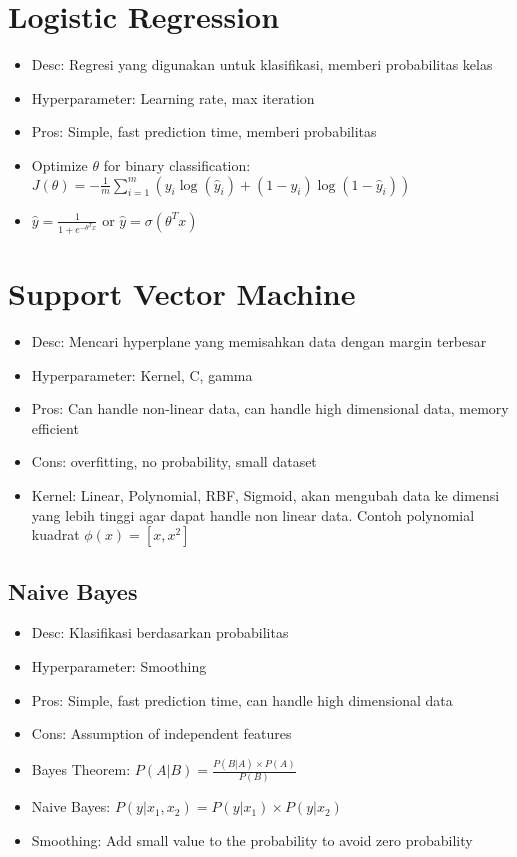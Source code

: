\documentclass[conference]{IEEEtran}
\begin{document}
\section{Logistic Regression}

\begin{itemize}
    \item Desc: Regresi yang digunakan untuk klasifikasi, memberi probabilitas kelas
    \item Hyperparameter: Learning rate, max iteration
    \item Pros: Simple, fast prediction time, memberi probabilitas
    \item Optimize \(\theta\) for binary classification: 
    \(J(\theta) = -\frac{1}{m} \sum_{i=1}^{m} (y_i \log(\hat{y}_i) + (1 - y_i) \log(1 - \hat{y}_i))\)
    \item \(\hat{y} = \frac{1}{1 + e^{-\theta^T x}}\) or \(\hat{y} = \sigma(\theta^T x)\)
\end{itemize}

\section{Support Vector Machine}

\begin{itemize}
    \item Desc: Mencari hyperplane yang memisahkan data dengan margin terbesar
    \item Hyperparameter: Kernel, C, gamma
    \item Pros: Can handle non-linear data, can handle high dimensional data, memory efficient
    \item Cons: overfitting, no probability, small dataset
    \item Kernel: Linear, Polynomial, RBF, Sigmoid, akan mengubah data ke dimensi yang lebih tinggi agar dapat handle non linear data. Contoh polynomial kuadrat \(\phi(x) = [x, x^2]\)
\end{itemize}

\subsection{Naive Bayes}

\begin{itemize}
    \item Desc: Klasifikasi berdasarkan probabilitas
    \item Hyperparameter: Smoothing
    \item Pros: Simple, fast prediction time, can handle high dimensional data
    \item Cons: Assumption of independent features
    \item Bayes Theorem: \(P(A|B) = \frac{P(B|A) \times P(A)}{P(B)}\)
    \item Naive Bayes: \(P(y|x_1, x_2) = P(y | x_1) \times P(y | x_2)\)
    \item Smoothing: Add small value to the probability to avoid zero probability
\end{itemize}
\end{document}
